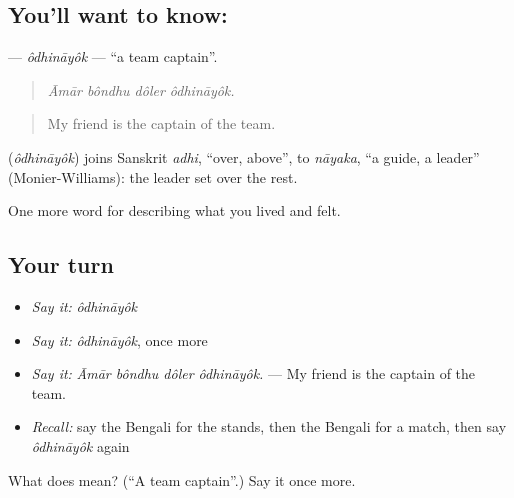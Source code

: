 \subsection*{You'll want to know: }
\textbf{} — \emph{ôdhināyôk} — \textquotedblleft{}a team captain\textquotedblright{}.

\begin{quote}
   
\end{quote}

\begin{quote}
\emph{Āmār bôndhu dôler ôdhināyôk.}
\end{quote}

\begin{quote}
My friend is the captain of the team.
\end{quote}

\begin{cousinweb}
\textbf{} (\emph{ôdhināyôk}) joins Sanskrit \emph{adhi}, \textquotedblleft{}over, above\textquotedblright{}, to \emph{nāyaka}, \textquotedblleft{}a guide, a leader\textquotedblright{} (Monier-Williams): the leader set over the rest.
\end{cousinweb}

\begin{grammarlens}[title={What you've built}]
One more word for describing what you lived and felt.
\end{grammarlens}

\subsection*{Your turn}
\begin{itemize}
\raggedright
  \item \emph{Say it:} \emph{ôdhināyôk}
  \item \emph{Say it:} \emph{ôdhināyôk}, once more
  \item \emph{Say it:} \emph{Āmār bôndhu dôler ôdhināyôk.} — My friend is the captain of the team.
  \item \emph{Recall:} say the Bengali for the stands, then the Bengali for a match, then say \emph{ôdhināyôk} again
\end{itemize}

\begin{tcolorbox}[breakable,colback=teal!4,colframe=teal!35!black,title={Before you move on}]
What does  mean? (\textquotedblleft{}A team captain\textquotedblright{}.) Say it once more.
\end{tcolorbox}
